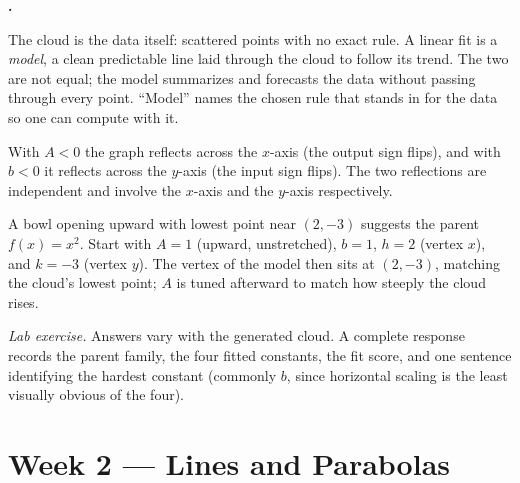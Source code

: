 \documentclass[12pt]{book}
\newcounter{soln}[section]
\newenvironment{solutions}{%
  \setcounter{soln}{0}%
  \begin{list}{\textbf{\arabic{soln}.}}{%
    \usecounter{soln}\setlength{\leftmargin}{2.2em}\setlength{\itemsep}{10pt}}%
}{\end{list}}
\begin{document}
\begin{solutions}
\item The cloud is the data itself: scattered points with no exact rule. A linear fit
is a \emph{model}, a clean predictable line laid through the cloud to follow its
trend. The two are not equal; the model summarizes and forecasts the data without
passing through every point. ``Model'' names the chosen rule that stands in for the
data so one can compute with it.

\item With $A<0$ the graph reflects across the $x$-axis (the output sign flips), and
with $b<0$ it reflects across the $y$-axis (the input sign flips). The two reflections
are independent and involve the $x$-axis and the $y$-axis respectively.

\item A bowl opening upward with lowest point near $(2,-3)$ suggests the parent
$f(x)=x^2$. Start with $A=1$ (upward, unstretched), $b=1$, $h=2$ (vertex $x$), and
$k=-3$ (vertex $y$). The vertex of the model then sits at $(2,-3)$, matching the
cloud's lowest point; $A$ is tuned afterward to match how steeply the cloud rises.

\item \emph{Lab exercise.} Answers vary with the generated cloud. A complete response
records the parent family, the four fitted constants, the fit score, and one sentence
identifying the hardest constant (commonly $b$, since horizontal scaling is the least
visually obvious of the four).
\end{solutions}

\section*{Week 2 — Lines and Parabolas}
\setcounter{section}{2}
\end{document}
